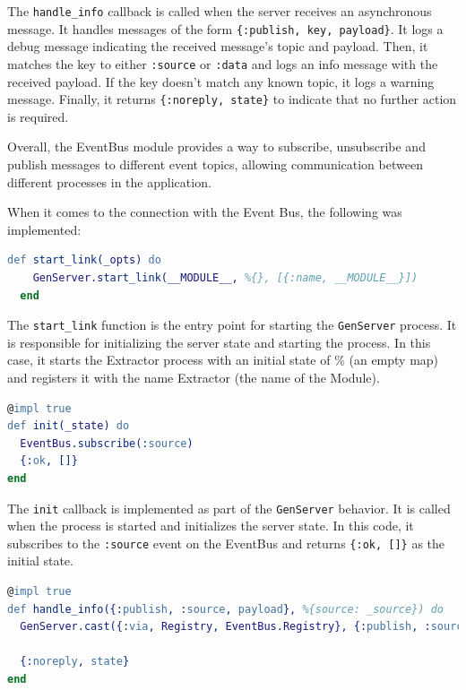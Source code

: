 The \texttt{handle\_info} callback is called when the server receives an asynchronous message. It handles messages of the form \texttt{\{:publish, key, payload\}}. It logs a debug message indicating the received message's topic and payload. Then, it matches the key to either \texttt{:source} or \texttt{:data} and logs an info message with the received payload. If the key doesn't match any known topic, it logs a warning message. Finally, it returns \texttt{\{:noreply, state\}} to indicate that no further action is required.\newline

Overall, the EventBus module provides a way to subscribe, unsubscribe and publish messages to different event topics, allowing communication between different processes in the application.\newline

When it comes to the connection with the Event Bus, the following was implemented:\newline

\begin{lstlisting}[language=erlang, caption={GenServer on extractor.ex}]
  def start_link(_opts) do
    GenServer.start_link(__MODULE__, %{}, [{:name, __MODULE__}])
  end
\end{lstlisting}

The \texttt{start\_link} function is the entry point for starting the \texttt{GenServer} process. It is responsible for initializing the server state and starting the process. In this case, it starts the Extractor process with an initial state of \%{} (an empty map) and registers it with the name Extractor (the name of the Module).\newline

\begin{lstlisting}[language=erlang, caption={Initialize state on extractor.ex}]
@impl true
def init(_state) do
  EventBus.subscribe(:source)
  {:ok, []}
end
\end{lstlisting}

The \texttt{init} callback is implemented as part of the \texttt{GenServer} behavior. It is called when the process is started and initializes the server state. In this code, it subscribes to the \texttt{:source} event on the EventBus and returns \texttt{\{:ok, []\}} as the initial state.\newline

\begin{lstlisting}[language=erlang, caption={Handle\_info for :source on extractor.ex}]
@impl true
def handle_info({:publish, :source, payload}, %{source: _source}) do
  GenServer.cast({:via, Registry, EventBus.Registry}, {:publish, :source, payload})

  {:noreply, state}
end
\end{lstlisting}

